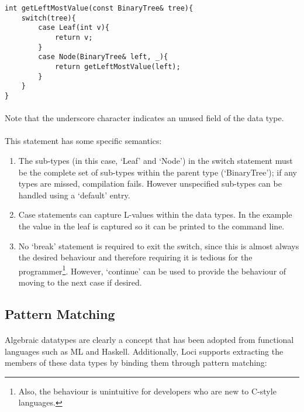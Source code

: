 \documentclass[12pt,twoside,notitlepage]{report}
\begin{document}
\begin{lstlisting}
int getLeftMostValue(const BinaryTree& tree){
	switch(tree){
		case Leaf(int v){
			return v;
		}
		case Node(BinaryTree& left, _){
			return getLeftMostValue(left);
		}
	}
}
\end{lstlisting}

\paragraph{}
Note that the underscore character indicates an unused field of the data type.

\paragraph{}
This statement has some specific semantics:

\begin{enumerate}
\item The sub-types (in this case, `Leaf' and `Node') in the switch statement must be the complete set of sub-types within the parent type (`BinaryTree'); if any types are missed, compilation fails. However unspecified sub-types can be handled using a `default' entry.
\item Case statements can capture L-values within the data types. In the example the value in the leaf is captured so it can be printed to the command line.
\item No `break' statement is required to exit the switch, since this is almost always the desired behaviour and therefore requiring it is tedious for the programmer\footnote{Also, the behaviour is unintuitive for developers who are new to C-style languages.}. However, `continue' can be used to provide the behaviour of moving to the next case if desired.
\end{enumerate}

\clearpage

\subsection{Pattern Matching}

\paragraph{}
Algebraic datatypes are clearly a concept that has been adopted from functional languages such as ML and Haskell. Additionally, Loci supports extracting the members of these data types by binding them through pattern matching:
\end{document}
